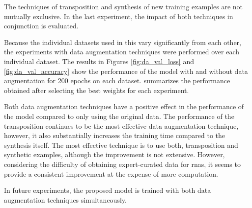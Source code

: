 
The techniques of transposition and synthesis of new
training examples are not mutually exclusive. In the last
experiment, the impact of both techniques in conjunction is
evaluated.

Because the individual datasets used in this \thesisdiss{}
vary significantly from each other, the experiments with
data augmentation techniques were performed over each
individual dataset. The results in Figures
\ref{fig:da_val_loss} and \ref{fig:da_val_accuracy} show the
performance of the model with and without data augmentation
for 200 epochs on each dataset. 
summarizes the performance obtained after selecting the best
weights for each experiment.




 Both data augmentation techniques have a positive effect in
 the performance of the model compared to only using the
 original data. The performance of the transposition
 continues to be the most effective data-augmentation
 technique, however, it also substantially increases the
 training time compared to the synthesis itself. The most
 effective technique is to use both, transposition and
 synthetic examples, although the improvement is not
 extensive. However, considering the difficulty of obtaining
 expert-curated data for \glspl{rna}, it seems to provide a
 consistent improvement at the expense of more computation.

 In future experiments, the proposed model is trained with
 both data augmentation techniques simultaneously.
